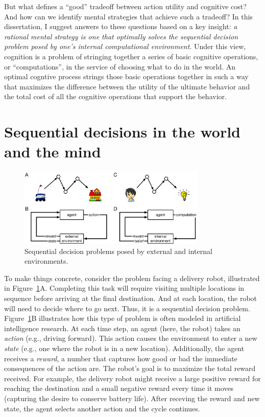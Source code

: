 But what defines a ``good'' tradeoff between action utility and cognitive cost? And how can we identify mental strategies that achieve such a tradeoff? In this dissertation, I suggest answers to these questions based on a key insight: \emph{a rational mental strategy is one that optimally solves the sequential decision problem posed by one's internal computational environment}. Under this view, cognition is a problem of stringing together a series of basic cognitive operations, or ``computations'', in the service of choosing what to do in the world. An optimal cogntive process strings those basic operations together in such a way that maximizes the difference between the utility of the ultimate behavior and the total cost of all the cognitive operations that support the behavior.


\section{Sequential decisions in the world and the mind}


\begin{figure}[t]
  \centering
  \includegraphics[width=0.8\textwidth]{diagrams/sequential-intuition.pdf}
  \caption{Sequential decision problems posed by external and internal environments.}
  \label{fig:sequential-intuition}
\end{figure}


To make things concrete, consider the problem facing a delivery robot, illustrated in Figure~\ref{fig:sequential-intuition}A. Completing this task will require visiting multiple locations in sequence before arriving at the final destination. And at each location, the robot will need to decide where to go next. Thus, it is a sequential decision problem. Figure~\ref{fig:sequential-intuition}B illustrates how this type of problem is often modeled in artificial intelligence research. At each time step, an agent (here, the robot) takes an \emph{action} (e.g., driving forward). This action causes the environment to enter a new \emph{state} (e.g., one where the robot is in a new location). Additionally, the agent receives a \emph{reward}, a number that captures how good or bad the immediate consequences of the action are. The robot's goal is to maximize the total reward received. For example, the delivery robot might receive a large positive reward for reaching the destination and a small negative reward every time it moves (capturing the desire to conserve battery life). After receving the reward and new state, the agent selects another action and the cycle continues.

